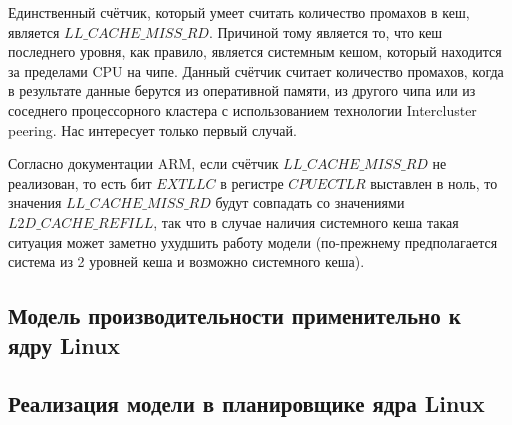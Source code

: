     Единственный счётчик, который умеет считать количество промахов в кеш, является
    $LL\_CACHE\_MISS\_RD$. Причиной тому является то, что кеш последнего уровня, как правило,
    является системным кешом, который находится за пределами CPU на чипе. Данный счётчик считает
    количество промахов, когда в результате данные берутся из оперативной памяти,
    из другого чипа или из соседнего процессорного кластера с использованием технологии
    Intercluster peering. Нас интересует только первый случай.

    Согласно документации ARM, если счётчик $LL\_CACHE\_MISS\_RD$ не реализован, то есть
    бит $EXTLLC$ в регистре $CPUECTLR$ выставлен в ноль, то значения $LL\_CACHE\_MISS\_RD$
    будут совпадать со значениями $L2D\_CACHE\_REFILL$, так что в случае наличия
    системного кеша такая ситуация может заметно ухудшить работу модели
    (по-прежнему предполагается система из 2 уровней кеша и возможно системного кеша).

\subsection{Модель производительности применительно к ядру Linux}



\subsection{Реализация модели в планировщике ядра Linux}




\newpage
